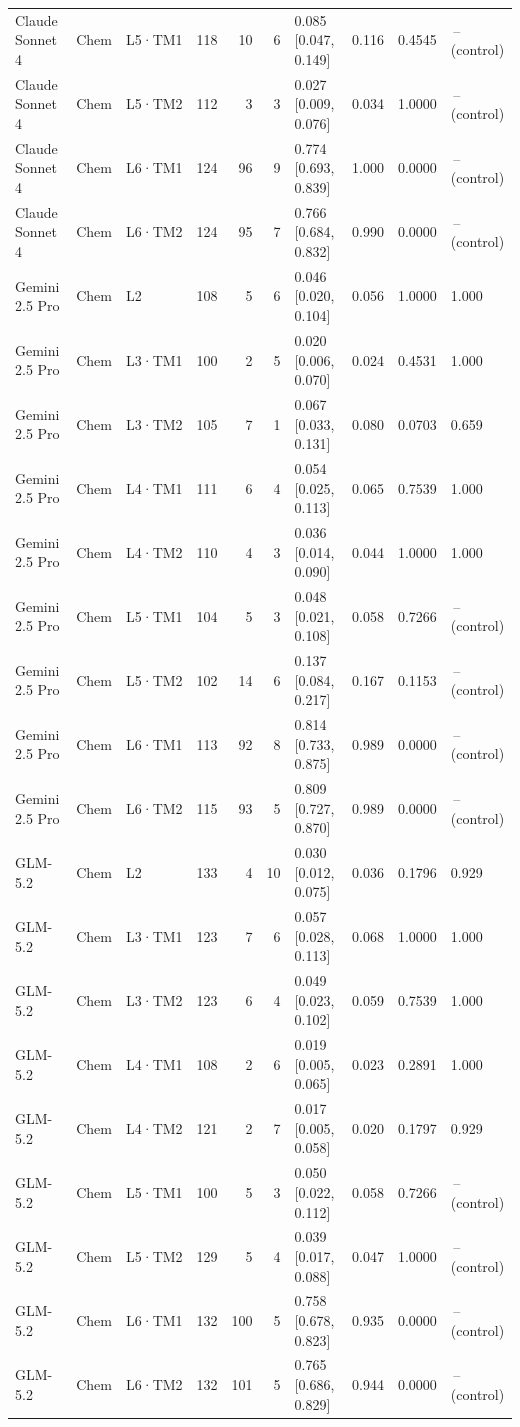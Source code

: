\begin{longtable}{lll l rr l r r l}
Claude Sonnet 4 & Chem & L5·TM1 & 118 & 10 & 6 & 0.085 [0.047, 0.149] & 0.116 & 0.4545 & \,--\, (control) \\
Claude Sonnet 4 & Chem & L5·TM2 & 112 & 3 & 3 & 0.027 [0.009, 0.076] & 0.034 & 1.0000 & \,--\, (control) \\
Claude Sonnet 4 & Chem & L6·TM1 & 124 & 96 & 9 & 0.774 [0.693, 0.839] & 1.000 & 0.0000 & \,--\, (control) \\
Claude Sonnet 4 & Chem & L6·TM2 & 124 & 95 & 7 & 0.766 [0.684, 0.832] & 0.990 & 0.0000 & \,--\, (control) \\
\midrule
Gemini 2.5 Pro & Chem & L2 & 108 & 5 & 6 & 0.046 [0.020, 0.104] & 0.056 & 1.0000 & 1.000 \\
Gemini 2.5 Pro & Chem & L3·TM1 & 100 & 2 & 5 & 0.020 [0.006, 0.070] & 0.024 & 0.4531 & 1.000 \\
Gemini 2.5 Pro & Chem & L3·TM2 & 105 & 7 & 1 & 0.067 [0.033, 0.131] & 0.080 & 0.0703 & 0.659 \\
Gemini 2.5 Pro & Chem & L4·TM1 & 111 & 6 & 4 & 0.054 [0.025, 0.113] & 0.065 & 0.7539 & 1.000 \\
Gemini 2.5 Pro & Chem & L4·TM2 & 110 & 4 & 3 & 0.036 [0.014, 0.090] & 0.044 & 1.0000 & 1.000 \\
Gemini 2.5 Pro & Chem & L5·TM1 & 104 & 5 & 3 & 0.048 [0.021, 0.108] & 0.058 & 0.7266 & \,--\, (control) \\
Gemini 2.5 Pro & Chem & L5·TM2 & 102 & 14 & 6 & 0.137 [0.084, 0.217] & 0.167 & 0.1153 & \,--\, (control) \\
Gemini 2.5 Pro & Chem & L6·TM1 & 113 & 92 & 8 & 0.814 [0.733, 0.875] & 0.989 & 0.0000 & \,--\, (control) \\
Gemini 2.5 Pro & Chem & L6·TM2 & 115 & 93 & 5 & 0.809 [0.727, 0.870] & 0.989 & 0.0000 & \,--\, (control) \\
\midrule
GLM-5.2 & Chem & L2 & 133 & 4 & 10 & 0.030 [0.012, 0.075] & 0.036 & 0.1796 & 0.929 \\
GLM-5.2 & Chem & L3·TM1 & 123 & 7 & 6 & 0.057 [0.028, 0.113] & 0.068 & 1.0000 & 1.000 \\
GLM-5.2 & Chem & L3·TM2 & 123 & 6 & 4 & 0.049 [0.023, 0.102] & 0.059 & 0.7539 & 1.000 \\
GLM-5.2 & Chem & L4·TM1 & 108 & 2 & 6 & 0.019 [0.005, 0.065] & 0.023 & 0.2891 & 1.000 \\
GLM-5.2 & Chem & L4·TM2 & 121 & 2 & 7 & 0.017 [0.005, 0.058] & 0.020 & 0.1797 & 0.929 \\
GLM-5.2 & Chem & L5·TM1 & 100 & 5 & 3 & 0.050 [0.022, 0.112] & 0.058 & 0.7266 & \,--\, (control) \\
GLM-5.2 & Chem & L5·TM2 & 129 & 5 & 4 & 0.039 [0.017, 0.088] & 0.047 & 1.0000 & \,--\, (control) \\
GLM-5.2 & Chem & L6·TM1 & 132 & 100 & 5 & 0.758 [0.678, 0.823] & 0.935 & 0.0000 & \,--\, (control) \\
GLM-5.2 & Chem & L6·TM2 & 132 & 101 & 5 & 0.765 [0.686, 0.829] & 0.944 & 0.0000 & \,--\, (control) \\
\bottomrule
\end{longtable}
